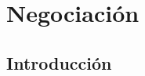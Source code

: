 \documentclass[handout,a4paper,slidestop,xcolor=pst,dvips,blue]{beamer}
\begin{document}
%
%
%

\section{Negociación}

\subsection{Introducción}
\end{document}

